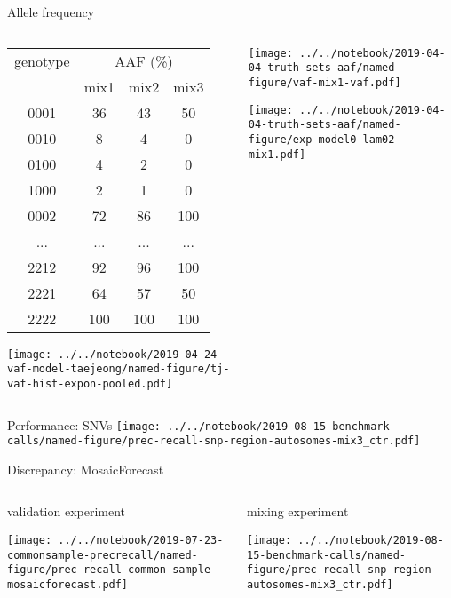 \documentclass{beamer}
\begin{document}
\begin{frame}{Allele frequency}
\begin{columns}[t]
\begin{column}{0.5\textwidth}

{\tiny
\begin{tabular}{c|ccc}
genotype & \multicolumn{3}{c}{AAF (\%)} \\
& mix1 &  mix2 & mix3 \\
\hline
0001 & 36 & 43 & 50\\
0010 & 8 & 4 & 0\\
0100 & 4 & 2 & 0\\
1000 & 2 & 1 & 0\\
0002 & 72 & 86 & 100\\
... & ... & ... & ...\\
2212 & 92 & 96 & 100\\
2221 & 64 & 57 & 50\\
2222 & 100 & 100 & 100\\
\end{tabular}
}

\texttt{[image: ../../notebook/2019-04-24-vaf-model-taejeong/named-figure/tj-vaf-hist-expon-pooled.pdf]}

\end{column}

\begin{column}{0.5\textwidth}

\texttt{[image: ../../notebook/2019-04-04-truth-sets-aaf/named-figure/vaf-mix1-vaf.pdf]}

\texttt{[image: ../../notebook/2019-04-04-truth-sets-aaf/named-figure/exp-model0-lam02-mix1.pdf]}
\end{column}
\end{columns}
\end{frame}

\begin{frame}{Performance: SNVs}
\texttt{[image: ../../notebook/2019-08-15-benchmark-calls/named-figure/prec-recall-snp-region-autosomes-mix3\_ctr.pdf]}
\end{frame}

\begin{frame}{Discrepancy: MosaicForecast}
\begin{columns}[t]
\begin{column}{0.5\textwidth}

validation experiment

\texttt{[image: ../../notebook/2019-07-23-commonsample-precrecall/named-figure/prec-recall-common-sample-mosaicforecast.pdf]}
\end{column}
\begin{column}{0.5\textwidth}

mixing experiment

\texttt{[image: ../../notebook/2019-08-15-benchmark-calls/named-figure/prec-recall-snp-region-autosomes-mix3\_ctr.pdf]}
\end{column}
\end{columns}
\end{frame}
\end{document}
